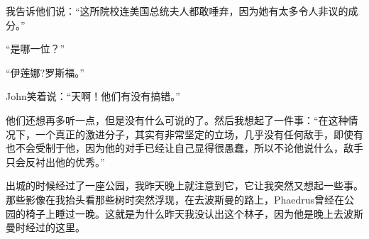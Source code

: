 \documentclass[UTF8]{article}
\begin{document}
\par 我告诉他们说：“这所院校连美国总统夫人都敢唾弃，因为她有太多令人非议的成分。”
\par “是哪一位？”
\par “伊莲娜?罗斯福。”
\par John笑着说：“天啊！他们有没有搞错。”
\par 他们还想再多听一点，但是没有什么可说的了。然后我想起了一件事：“在这种情况下，一个真正的激进分子，其实有非常坚定的立场，几乎没有任何敌手，即使有也不会受制于他，因为他的对手已经让自己显得很愚蠢，所以不论他说什么，敌手只会反衬出他的优秀。”
\par 出城的时候经过了一座公园，我昨天晚上就注意到它，它让我突然又想起一些事。那些影像在我抬头看那些树时突然浮现，在去波斯曼的路上，Phaedrus曾经在公园的椅子上睡过一晚。这就是为什么昨天我没认出这个林子，因为他是晚上去波斯曼时经过的这里。
\end{document}
